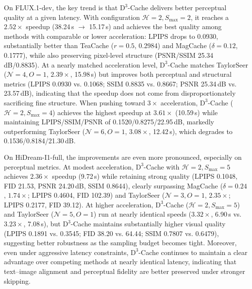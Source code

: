 On FLUX.1-dev,
the key trend is that $\mathrm{D}^3$-Cache
delivers better perceptual quality
at a given latency.
With configuration \(\mathcal{H}{=}2,S_{\mathrm{max}}{=}2\),
it reaches a \(2.52\times\) speedup
(38.24\,s \(\rightarrow\) 15.17\,s)
and achieves the best quality
among methods
with comparable or lower acceleration:
LPIPS drops to 0.0930,
substantially better than TeaCache
(\(r{=}0.5\), 0.2984)
and MagCache
(\(\delta{=}0.12\), 0.1777),
while also preserving pixel-level structure
(PSNR/SSIM 25.34\,dB/0.8835).
At a nearly matched acceleration level,
$\mathrm{D}^3$-Cache
matches TaylorSeer
(\(\mathcal{N}{=}4,O{=}1\), \(2.39\times\), 15.98\,s)
but improves both perceptual and structural metrics
(LPIPS 0.0930 vs. 0.1068;
SSIM 0.8835 vs. 0.8667;
PSNR 25.34\,dB vs. 23.57\,dB),
indicating that the speedup does not come
from disproportionately sacrificing fine structure.
When pushing toward \(3\times\) acceleration,
$\mathrm{D}^3$-Cache
(\(\mathcal{H}{=}2,S_{\mathrm{max}}{=}4\))
achieves the highest speedup
at \(3.61\times\) (10.59\,s)
while maintaining LPIPS/SSIM/PSNR
of 0.1520/0.8275/22.95\,dB,
markedly outperforming TaylorSeer
(\(\mathcal{N}{=}6,O{=}1\), \(3.08\times\), 12.42\,s),
which degrades to 0.1536/0.8184/21.30\,dB.


% 

On HiDream-I1-full,
the improvements are even more pronounced,
especially on perceptual metrics.
At modest acceleration,
$\mathrm{D}^3$-Cache
with \(\mathcal{H}{=}2,S_{\mathrm{max}}{=}5\)
achieves \(2.36\times\) speedup (9.72\,s)
while retaining strong quality
(LPIPS 0.1048, FID 21.53, PSNR 24.20\,dB, SSIM 0.8644),
clearly surpassing MagCache
(\(\delta{=}0.24\), \(1.74\times\); LPIPS 0.4604, FID 102.39)
and TaylorSeer
(\(\mathcal{N}{=}3,O{=}1\), \(2.35\times\); LPIPS 0.2177, FID 39.12).
At higher acceleration,
$\mathrm{D}^3$-Cache
(\(\mathcal{H}{=}2,S_{\mathrm{max}}{=}5\))
and TaylorSeer
(\(\mathcal{N}{=}5,O{=}1\))
run at nearly identical speeds
(\(3.32\times\), 6.90\,s vs. \(3.23\times\), 7.08\,s),
but $\mathrm{D}^3$-Cache
maintains substantially higher visual quality
(LPIPS 0.1891 vs. 0.3545;
FID 38.20 vs. 64.44;
SSIM 0.7807 vs. 0.6479),
suggesting better robustness
as the sampling budget becomes tight.
Moreover,
even under aggressive latency constraints,
$\mathrm{D}^3$-Cache
continues to maintain a clear advantage over competing methods
at nearly identical latency, indicating that text--image alignment
and perceptual fidelity are better preserved under stronger skipping.

